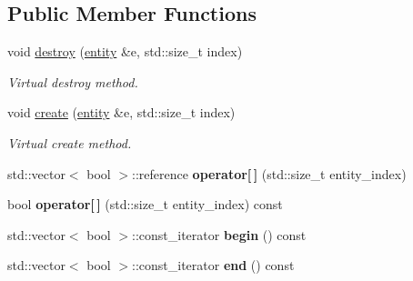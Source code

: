 \subsection*{Public Member Functions}
\begin{DoxyCompactItemize}
\item 
void \hyperlink{classophidian_1_1entity_1_1vector__property_3_01bool_01_4_a3d61196d880589d68bf68d81c3310643}{destroy} (\hyperlink{classophidian_1_1entity_1_1entity}{entity} \&e, std\-::size\-\_\-t index)
\begin{DoxyCompactList}\small\item\em Virtual destroy method. \end{DoxyCompactList}\item 
void \hyperlink{classophidian_1_1entity_1_1vector__property_3_01bool_01_4_a3a00eae6f787b0d5cb5b782c931f2774}{create} (\hyperlink{classophidian_1_1entity_1_1entity}{entity} \&e, std\-::size\-\_\-t index)
\begin{DoxyCompactList}\small\item\em Virtual create method. \end{DoxyCompactList}\item 
\hypertarget{classophidian_1_1entity_1_1vector__property_3_01bool_01_4_a8cdce9916803893909c23eda1f4dad74}{std\-::vector$<$ bool $>$\-::reference {\bfseries operator\mbox{[}$\,$\mbox{]}} (std\-::size\-\_\-t entity\-\_\-index)}\label{classophidian_1_1entity_1_1vector__property_3_01bool_01_4_a8cdce9916803893909c23eda1f4dad74}

\item 
\hypertarget{classophidian_1_1entity_1_1vector__property_3_01bool_01_4_ab06b73c923431b61596e25ae6d517852}{bool {\bfseries operator\mbox{[}$\,$\mbox{]}} (std\-::size\-\_\-t entity\-\_\-index) const }\label{classophidian_1_1entity_1_1vector__property_3_01bool_01_4_ab06b73c923431b61596e25ae6d517852}

\item 
\hypertarget{classophidian_1_1entity_1_1vector__property_3_01bool_01_4_a5b73b48445f4a6be9918b0ec98c98c18}{std\-::vector$<$ bool $>$\-::const\-\_\-iterator {\bfseries begin} () const }\label{classophidian_1_1entity_1_1vector__property_3_01bool_01_4_a5b73b48445f4a6be9918b0ec98c98c18}

\item 
\hypertarget{classophidian_1_1entity_1_1vector__property_3_01bool_01_4_a01b33e945c09eccaee7715108fb3b7a2}{std\-::vector$<$ bool $>$\-::const\-\_\-iterator {\bfseries end} () const }\label{classophidian_1_1entity_1_1vector__property_3_01bool_01_4_a01b33e945c09eccaee7715108fb3b7a2}

\end{DoxyCompactItemize}


